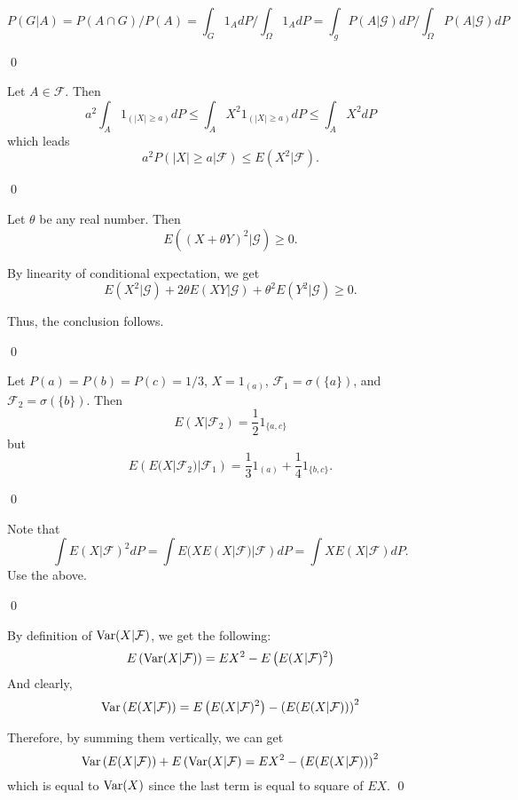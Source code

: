 \begin{problem}[4.1.1] \hfill

	\[
		P(G | A) = P(A \cap G) / P(A) = \int_G 1_A dP / \int_\Omega 1_A dP = \int_g P(A|\mathcal{G})dP / \int_\Omega P(A|\mathcal{G}) dP
	\]

	\qed
\end{problem}

\begin{problem}[4.1.2]\hfill

	Let $A \in \mathcal{F}$.
	Then
	\[
		a^2 \int_A 1_{(|X| \geq a)}dP \leq \int_A X^2 1_{(|X| \geq a)}dP \leq \int_A X^2 dP
	\]
	which leads
	\[
		a^2 P(|X| \geq a | \mathcal{F}) \leq E(X^2 | \mathcal{F}).
	\]

\qed	
\end{problem}

\begin{problem}[4.1.3]\hfill

	Let $\theta$ be any real number.
	Then
	\[
		E\left( (X+\theta Y)^2 | \mathcal{G} \right) \geq 0.
	\]
	
	By linearity of conditional expectation, we get
	\[
		E(X^2 |\mathcal{G}) + 2\theta E(XY | \mathcal{G}) + \theta^2 E(Y^2 | \mathcal{G}) \geq 0.
	\]

	Thus, the conclusion follows.

	\qed
	
\end{problem}

\begin{problem}[4.1.5] \hfill

	Let $P(a) = P(b) = P(c) = 1/3$, $X = 1_{(a)}$, $\mathcal{F}_1 = \sigma(\{a\})$, and $\mathcal{F}_2 = \sigma(\{b\})$.
	Then
	\[
		E(X | \mathcal{F}_2) = \frac{1}{2} 1_{\{a, c\}}
	\]
	but
	\[
		E\left( E(X |\mathcal{F}_2) | \mathcal{F}_1 \right) = \frac{1}{3}1_{(a)} + \frac{1}{4}1_{\{b, c\}}.
	\]

	\qed
	
\end{problem}

\begin{problem}[4.1.6] \hfill

	Note that
	\[
		\int E(X|\mathcal{F})^2 dP = \int E(X E(X|\mathcal{F}) | \mathcal{F}) dP = \int X E(X |\mathcal{F}) dP.
	\]
	Use the above.

	\qed
	
\end{problem}

\begin{problem}[4.1.7] \hfill

	By definition of $\operatorname{Var} (X | \mathcal{F})$, we get the following:
\[
	E \left( \operatorname{Var} (X | \mathcal{F} ) \right) = EX^2 - E\left( E(X|\mathcal{F})^2 \right)
\]
	And clearly,
\[
	\operatorname{Var} \left( E(X|\mathcal{F}) \right) = E\left( E(X|\mathcal{F})^2 \right) - \left( E( E(X|\mathcal{F}) ) \right)^2
\]

Therefore, by summing them vertically, we can get
\[
	\operatorname{Var} \left( E(X|\mathcal{F}) \right) + E\left( \operatorname{Var}(X|\mathcal{F} \right) = EX^2 - \left( E(E(X|\mathcal{F})) \right)^2
\]
which is equal to $\operatorname{Var}(X)$ since the last term is equal to square of $EX$.
\qed
\end{problem}

